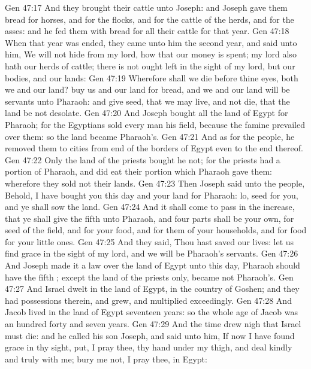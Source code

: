 \vs Gen 47:17 And they brought their cattle unto Joseph: and Joseph gave them bread  for horses, and for the flocks, and for the cattle of the herds, and for the asses: and he fed them with bread for all their cattle for that year.
\vs Gen 47:18 When that year was ended, they came unto him the second year, and said unto him, We will not hide  from my lord, how that our money is spent; my lord also hath our herds of cattle; there is not ought left in the sight of my lord, but our bodies, and our lands:
\vs Gen 47:19 Wherefore shall we die before thine eyes, both we and our land? buy us and our land for bread, and we and our land will be servants unto Pharaoh: and give  seed, that we may live, and not die, that the land be not desolate.
\vs Gen 47:20 And Joseph bought all the land of Egypt for Pharaoh; for the Egyptians sold every man his field, because the famine prevailed over them: so the land became Pharaoh's.
\vs Gen 47:21 And as for the people, he removed them to cities from  end of the borders of Egypt even to the  end thereof.
\vs Gen 47:22 Only the land of the priests bought he not; for the priests had a portion  of Pharaoh, and did eat their portion which Pharaoh gave them: wherefore they sold not their lands.
\vs Gen 47:23 Then Joseph said unto the people, Behold, I have bought you this day and your land for Pharaoh: lo,  seed for you, and ye shall sow the land.
\vs Gen 47:24 And it shall come to pass in the increase, that ye shall give the fifth  unto Pharaoh, and four parts shall be your own, for seed of the field, and for your food, and for them of your households, and for food for your little ones.
\vs Gen 47:25 And they said, Thou hast saved our lives: let us find grace in the sight of my lord, and we will be Pharaoh's servants.
\vs Gen 47:26 And Joseph made it a law over the land of Egypt unto this day,  Pharaoh should have the fifth ; except the land of the priests only,  became not Pharaoh's.
\vs Gen 47:27 And Israel dwelt in the land of Egypt, in the country of Goshen; and they had possessions therein, and grew, and multiplied exceedingly.
\vs Gen 47:28 And Jacob lived in the land of Egypt seventeen years: so the whole age of Jacob was an hundred forty and seven years.
\vs Gen 47:29 And the time drew nigh that Israel must die: and he called his son Joseph, and said unto him, If now I have found grace in thy sight, put, I pray thee, thy hand under my thigh, and deal kindly and truly with me; bury me not, I pray thee, in Egypt:
